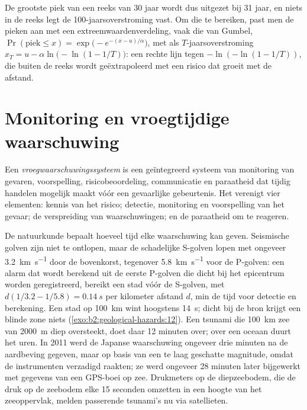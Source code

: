 De grootste piek van een reeks van 30 jaar wordt dus uitgezet bij 31 jaar, en niets in de reeks legt
de 100-jaarsoverstroming vast. Om die te bereiken, past men de pieken aan met een extreemwaardenverdeling, vaak die van Gumbel,
$\Pr(\text{piek} \leq x) = \exp\bigl(-e^{-(x - u)/\alpha}\bigr)$, met als $T$-jaarsoverstroming $x_T = u
- \alpha\ln\bigl(-\ln(1 - 1/T)\bigr)$: een rechte lijn tegen $-\ln(-\ln(1 - 1/T))$, die buiten de reeks
wordt geëxtrapoleerd met een risico dat groeit met de afstand.

\section{Monitoring en vroegtijdige waarschuwing}\label{sec:b2:geological-hazards:warning}

\begin{definition}[Vroegwaarschuwingssysteem]\label{def:b2:geological-hazards:warning}
Een \emph{vroegwaarschuwingssysteem} is een geïntegreerd systeem van
monitoring van gevaren, voorspelling, risicobeoordeling, communicatie en paraatheid dat tijdig
handelen mogelijk maakt vóór een gevaarlijke gebeurtenis. Het verenigt vier elementen: kennis van het risico; detectie,
monitoring en voorspelling van het gevaar; de verspreiding van waarschuwingen; en de paraatheid om
te reageren.
\end{definition}

De natuurkunde bepaalt hoeveel tijd elke waarschuwing kan geven. Seismische golven zijn niet te ontlopen, maar de schadelijke
S-golven lopen met ongeveer \qty{3.2}{km.s^{-1}} door de bovenkorst, tegenover \qty{5.8}{km.s^{-1}} voor
de P-golven: een alarm dat wordt berekend uit de eerste P-golven die dicht bij het epicentrum worden geregistreerd, bereikt een stad
vóór de S-golven, met $d(1/3.2 - 1/5.8) = \qty{0.14}{s}$ per kilometer afstand $d$, min de
tijd voor detectie en berekening. Een stad op \qty{100}{km} wint hoogstens \qty{14}{s}; dicht bij de bron krijgt een
blinde zone niets (\cref{exo:b2:geological-hazards:12}). Een tsunami die \qty{100}{km} zee van
\qty{2000}{m} diep oversteekt, doet daar 12 minuten over; over een oceaan duurt het uren. In 2011 werd de Japanse
waarschuwing ongeveer drie minuten na de aardbeving gegeven, maar op basis van een te laag geschatte magnitude,
omdat de instrumenten verzadigd raakten; ze werd ongeveer 28 minuten later bijgewerkt met gegevens van een GPS-boei op zee.
Drukmeters op de diepzeebodem, die de druk op de zeebodem elke 15 seconden omzetten in een
hoogte van het zeeoppervlak, melden passerende tsunami's nu via satellieten.

